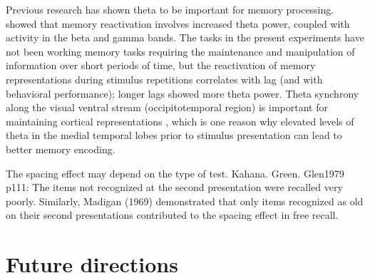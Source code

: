 Previous research has shown theta to be important for memory processing.
 showed that memory reactivation involves increased theta power, coupled with activity in the beta and gamma bands.
The tasks in the present experiments have not been working memory tasks requiring the maintenance and manipulation of information over short periods of time, but the reactivation of memory representations during stimulus repetitions correlates with lag (and with behavioral performance); longer lags showed more theta power.
Theta synchrony along the visual ventral stream (occipitotemporal region) is important for maintaining cortical representations \cite{DuzeEtal2010}, which is one reason why elevated levels of theta in the medial temporal lobes prior to stimulus presentation can lead to better memory encoding.

The spacing effect may depend on the type of test. Kahana. Green. Glen1979 p111: The items not recognized at the second presentation were recalled very poorly. Similarly, Madigan (1969) demonstrated that only items recognized as old on their second presentations contributed to the spacing effect in free recall.







\section{Future directions}


